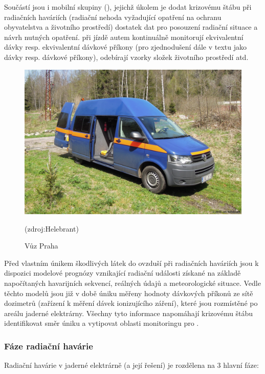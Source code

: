Součástí  jsou i mobilní skupiny (), jejichž úkolem je dodat krizovému štábu při radiačních haváriích (radiační nehoda vyžadující opatření na ochranu obyvatelstva a životního prostředí) dostatek dat pro posouzení radiační situace a návrh nutných opatření.  při jízdě autem kontinuálně monitorují ekvivalentní dávky resp. ekvivalentní dávkové příkony (pro zjednodušení dále v textu jako dávky resp. dávkové příkony), odebírají vzorky složek životního prostředí atd. 

\begin{figure}[H]
    \centering
    \includegraphics[scale=0.6]{./pictures/vuzSURO.jpg}
      	\caption[Vůz   Praha]{Vůz   Praha}(zdroj:Helebrant)
    	\label{fig:vuzSURO}
\end{figure} 

Před vlastním únikem škodlivých látek do ovzduší při radiačních haváriích jsou k dispozici modelové prognózy vznikající radiační události získané na základě napočítaných havarijních sekvencí, reálných údajů a meteorologické situace. Vedle těchto modelů jsou již v době úniku měřeny hodnoty dávkových příkonů ze sítě dozimetrů (zařízení k měření dávek ionizujícího záření), které jsou rozmístěné po areálu jaderné elektrárny. Všechny tyto informace napomáhají krizovému štábu identifikovat směr úniku a vytipovat oblasti monitoringu pro . 

\subsubsection{Fáze radiační havárie}

Radiační havárie v jaderné elektrárně (a její řešení) je rozdělena na 3 hlavní fáze:


